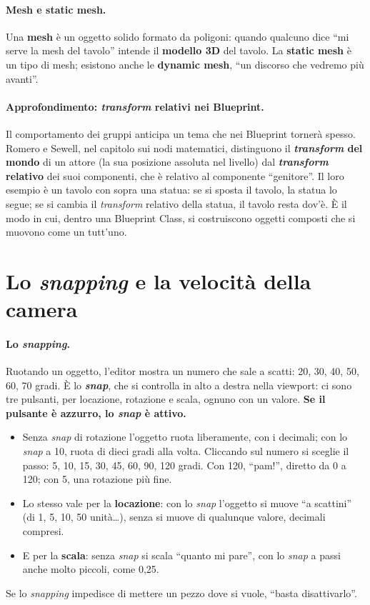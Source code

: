 \paragraph{Mesh e static mesh.} Una \textbf{mesh} è un oggetto solido formato da
poligoni: quando qualcuno dice ``mi serve la mesh del tavolo'' intende il
\textbf{modello 3D} del tavolo. La \textbf{static mesh} è un tipo di mesh; esistono anche
le \textbf{dynamic mesh}, ``un discorso che vedremo più avanti''.

\paragraph{Approfondimento: \emph{transform} relativi nei Blueprint.} Il comportamento dei
gruppi anticipa un tema che nei Blueprint tornerà spesso. Romero e Sewell, nel capitolo
sui nodi matematici, distinguono il \textbf{\emph{transform} del mondo} di un attore
(la sua posizione assoluta nel livello) dal \textbf{\emph{transform} relativo} dei suoi
componenti, che è relativo al componente ``genitore''. Il loro esempio è un tavolo con
sopra una statua: se si sposta il tavolo, la statua lo segue; se si cambia il
\emph{transform} relativo della statua, il tavolo resta dov'è. È il modo in cui, dentro
una Blueprint Class, si costruiscono oggetti composti che si muovono come un tutt'uno.

\section{Lo \emph{snapping} e la velocità della camera}
\label{ue1:sec:snap}

\paragraph{Lo \emph{snapping}.} Ruotando un oggetto, l'editor mostra un numero che sale
a scatti: 20, 30, 40, 50, 60, 70 gradi. È lo \textbf{\emph{snap}}, che si controlla in
alto a destra nella viewport: ci sono tre pulsanti, per locazione, rotazione e scala,
ognuno con un valore. \textbf{Se il pulsante è azzurro, lo \emph{snap} è attivo.}
\begin{itemize}
  \item Senza \emph{snap} di rotazione l'oggetto ruota liberamente, con i decimali; con
        lo \emph{snap} a 10, ruota di dieci gradi alla volta. Cliccando sul numero si
        sceglie il passo: 5, 10, 15, 30, 45, 60, 90, 120 gradi. Con 120, ``pam!'',
        diretto da 0 a 120; con 5, una rotazione più fine.
  \item Lo stesso vale per la \textbf{locazione}: con lo \emph{snap} l'oggetto si muove
        ``a scattini'' (di 1, 5, 10, 50 unità\ldots), senza si muove di qualunque
        valore, decimali compresi.
  \item E per la \textbf{scala}: senza \emph{snap} si scala ``quanto mi pare'', con lo
        \emph{snap} a passi anche molto piccoli, come 0,25.
\end{itemize}
Se lo \emph{snapping} impedisce di mettere un pezzo dove si vuole, ``basta
disattivarlo''.

